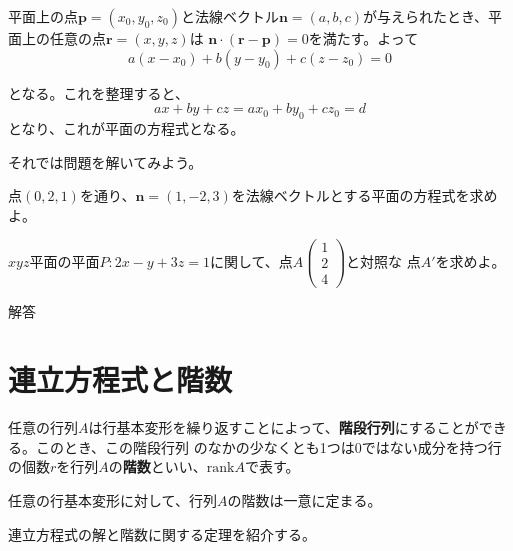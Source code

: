 \documentclass{jlreq}
\begin{document}
\begin{theorembox}[平面の方程式]
  平面上の点$\boldsymbol{p} = (x_0, y_0, z_0)$と法線ベクトル$\boldsymbol{n} = (a, b, c)$が与えられたとき、平面上の任意の点$\boldsymbol{r} = (x, y, z)$は
  $\boldsymbol{n} \cdot (\boldsymbol{r} - \boldsymbol{p}) = 0$を満たす。よって
  \begin{equation*}
    a(x - x_0) + b(y - y_0) + c(z - z_0) = 0
  \end{equation*}

  となる。これを整理すると、
  \begin{equation*}
    ax + by + cz = a x_0 + b y_0 + c z_0 = d
  \end{equation*}
   となり、これが平面の方程式となる。
\end{theorembox}

それでは問題を解いてみよう。

\begin{problem}
  点$(0, 2, 1)$を通り、$\boldsymbol{n} = (1, -2, 3)$を法線ベクトルとする平面の方程式を求めよ。
\end{problem}

\begin{problem}
  $xyz$平面の平面$P: 2x - y + 3z = 1$に関して、点$A \begin{pmatrix} 1 \\ 2 \\ 4 \end{pmatrix}$と対照な
  点$A'$を求めよ。

  \dotfill
  解答 \\
\end{problem}

\section{連立方程式と階数}
\begin{definitionbox}[階数]
  任意の行列$A$は行基本変形を繰り返すことによって、\textbf{階段行列}にすることができる。このとき、この階段行列
  のなかの少なくとも1つは0ではない成分を持つ行の個数$r$を行列$A$の\textbf{階数}といい、$\text{rank} A$で表す。

  任意の行基本変形に対して、行列$A$の階数は一意に定まる。
\end{definitionbox}

連立方程式の解と階数に関する定理を紹介する。
\end{document}
